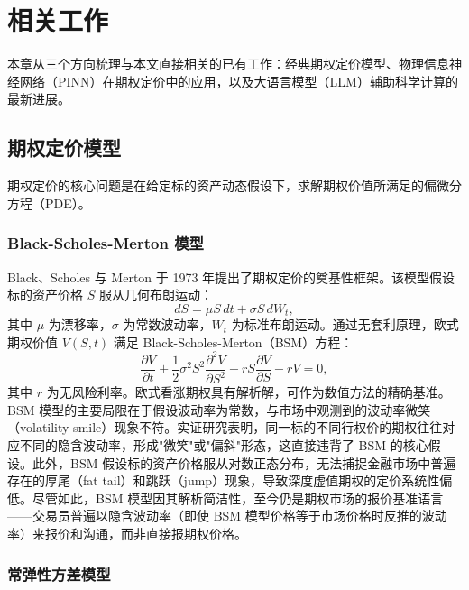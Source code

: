 \chapter{相关工作}\label{chap:related}

本章从三个方向梳理与本文直接相关的已有工作：经典期权定价模型、物理信息神经网络（PINN）在期权定价中的应用，以及大语言模型（LLM）辅助科学计算的最新进展。

\section{期权定价模型}\label{sec:option_models}

期权定价的核心问题是在给定标的资产动态假设下，求解期权价值所满足的偏微分方程（PDE）。

\subsection{Black-Scholes-Merton 模型}

Black、Scholes 与 Merton 于 1973 年提出了期权定价的奠基性框架\citep{black1973pricing,merton1973theory}。该模型假设标的资产价格 $S$ 服从几何布朗运动：
\begin{equation}
  dS = \mu S\,dt + \sigma S\,dW_t,
\end{equation}
其中 $\mu$ 为漂移率，$\sigma$ 为常数波动率，$W_t$ 为标准布朗运动。通过无套利原理，欧式期权价值 $V(S,t)$ 满足 Black-Scholes-Merton（BSM）方程：
\begin{equation}\label{eq:bsm}
  \frac{\partial V}{\partial t}
  + \frac{1}{2}\sigma^2 S^2 \frac{\partial^2 V}{\partial S^2}
  + rS\frac{\partial V}{\partial S}
  - rV = 0,
\end{equation}
其中 $r$ 为无风险利率。欧式看涨期权具有解析解，可作为数值方法的精确基准。BSM 模型的主要局限在于假设波动率为常数，与市场中观测到的波动率微笑（volatility smile）现象不符。实证研究表明，同一标的不同行权价的期权往往对应不同的隐含波动率，形成"微笑"或"偏斜"形态，这直接违背了 BSM 的核心假设。此外，BSM 假设标的资产价格服从对数正态分布，无法捕捉金融市场中普遍存在的厚尾（fat tail）和跳跃（jump）现象，导致深度虚值期权的定价系统性偏低。尽管如此，BSM 模型因其解析简洁性，至今仍是期权市场的报价基准语言——交易员普遍以隐含波动率（即使 BSM 模型价格等于市场价格时反推的波动率）来报价和沟通，而非直接报期权价格。

\subsection{常弹性方差模型}

